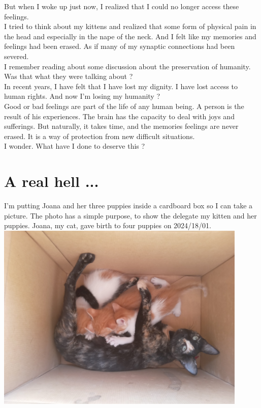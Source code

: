 \documentclass[11pt]{book}
\begin{document}
\noindent But when I woke up just now, I realized that I could no longer access these feelings. \\

\noindent I tried to think about my kittens and realized that some form of physical pain in the head and especially in the nape of the neck. And I felt like my memories and feelings had been erased. As if many of my synaptic connections had been severed. \\

\noindent I remember reading about some discussion about the preservation of humanity. Was that what they were talking about ? \\

\noindent In recent years, I have felt that I have lost my dignity. I have lost access to human rights. And now I'm losing my humanity ? \\

\noindent Good or bad feelings are part of the life of any human being. A person is the result of his experiences. The brain has the capacity to deal with joys and sufferings. But naturally, it takes time, and the memories feelings are never erased. It is a way of protection from new difficult situations. \\

\noindent I wonder. What have I done to deserve this ?

\chapter{A real hell ...}

\noindent I'm putting Joana and her three puppies inside a cardboard box so I can take a picture. The photo has a simple purpose, to show the delegate my kitten and her puppies. Joana, my cat, gave birth to four puppies on 2024/18/01. \\

\includegraphics[width=0.9\textwidth]{figures/puppies.jpg} \\
\end{document}
